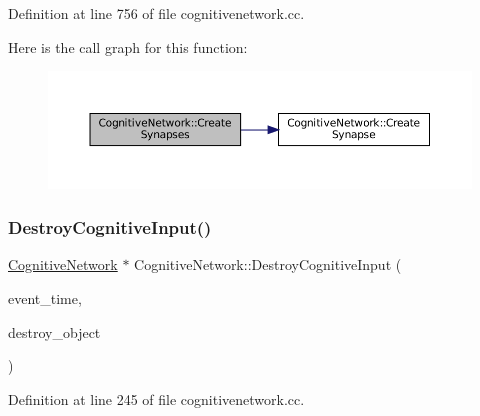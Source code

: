 Definition at line 756 of file cognitivenetwork.\+cc.

Here is the call graph for this function\+:\nopagebreak
\begin{figure}[H]
\begin{center}
\leavevmode
\includegraphics[width=350pt]{class_cognitive_network_ae6ae16f401e7699032ac9459132763c0_cgraph}
\end{center}
\end{figure}
\mbox{\label{class_cognitive_network_a12e085cd47b7661190527fe55b6da8dc}} 
\subsubsection{\texorpdfstring{Destroy\+Cognitive\+Input()}{DestroyCognitiveInput()}}
{\footnotesize\ttfamily \mbox{\hyperlink{class_cognitive_network}{Cognitive\+Network}} $\ast$ Cognitive\+Network\+::\+Destroy\+Cognitive\+Input (\begin{DoxyParamCaption}\item[{std\+::chrono\+::time\+\_\+point$<$ \mbox{\hyperlink{universe_8h_a0ef8d951d1ca5ab3cfaf7ab4c7a6fd80}{Clock}} $>$}]{event\+\_\+time,  }\item[{\mbox{\hyperlink{class_cognitive_network}{Cognitive\+Network}} $\ast$}]{destroy\+\_\+object }\end{DoxyParamCaption})}



Definition at line 245 of file cognitivenetwork.\+cc.

\mbox{\label{class_cognitive_network_a00aa44de67dd0593a2498ce7a3b4c0f2}} 
